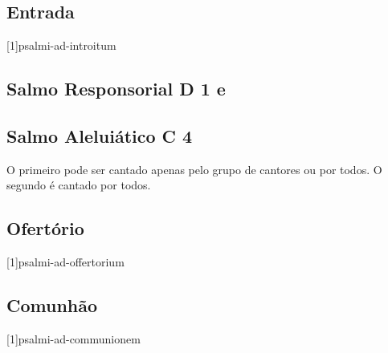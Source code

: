
\subsection{Entrada}\label{subsection:missae-pro-varii-necessitatibus/pro-unitate-christianorum/introitus}
[1]{psalmi-ad-introitum}

\subsection[Salmo Responsorial]{Salmo Responsorial \textmd{D 1 e}}\label{subsection:missae-pro-varii-necessitatibus/pro-unitate-christianorum/psalmus-responsorius}

\AllowPageFlush

\subsection[Salmo Aleluiático]{Salmo Aleluiático \textmd{C 4}}\label{subsection:missae-pro-varii-necessitatibus/pro-unitate-christianorum/psalmus-alleluiaticus}
\begin{rubrica}
    O primeiro {\normalfont\Rbar} pode ser cantado apenas pelo grupo de cantores ou por todos. O segundo {\normalfont\Rbar} é cantado por todos.
  \end{rubrica}

\AllowPageFlush

\subsection{Ofertório}\label{subsection:missae-pro-varii-necessitatibus/pro-unitate-christianorum/offertorium}
[1]{psalmi-ad-offertorium}

\AllowPageFlush

\subsection{Comunhão}\label{subsection:missae-pro-varii-necessitatibus/pro-unitate-christianorum/communio-1}
[1]{psalmi-ad-communionem}